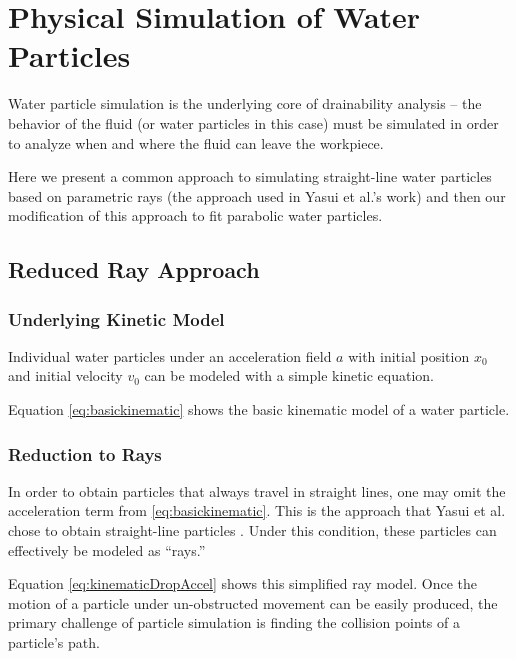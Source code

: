 						\chapter{Physical Simulation of Water Particles}

Water particle simulation is the underlying core of drainability analysis -- the behavior of the fluid (or water particles in this case) must be simulated in order to analyze when and where the fluid can leave the workpiece.

Here we present a common approach to simulating straight-line water particles based on parametric rays (the approach used in Yasui et al.'s work) and then our modification of this approach to fit parabolic water particles.

\section{Reduced Ray Approach}

	\subsection{Underlying Kinetic Model}

Individual water particles under an acceleration field $a$ with initial position $x_0$ and initial velocity $v_0$ can be modeled with a simple kinetic equation.


Equation \eqref{eq:basickinematic} shows the basic kinematic model of a water particle.


	\subsection{Reduction to Rays}

In order to obtain particles that always travel in straight lines, one may omit the acceleration term from \eqref{eq:basickinematic}. This is the approach that Yasui et al. chose to obtain straight-line particles \cite{Yasui2011}. Under this condition, these particles can effectively be modeled as ``rays.''


Equation \eqref{eq:kinematicDropAccel} shows this simplified ray model. Once the motion of a particle under un-obstructed movement can be easily produced, the primary challenge of particle simulation is finding the collision points of a particle's path.

